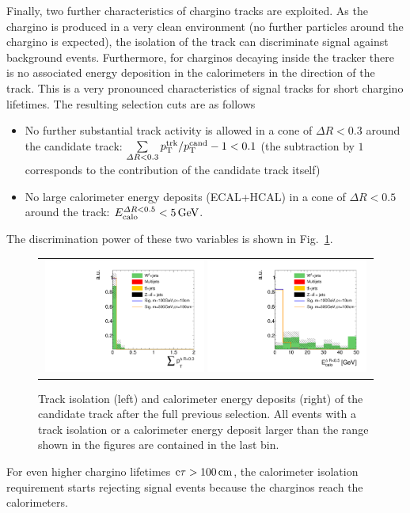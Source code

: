 Finally, two further characteristics of chargino tracks are exploited.
As the chargino is produced in a very clean environment (no further particles around the chargino is expected), the isolation of the track can discriminate signal against background events.
Furthermore, for charginos decaying inside the tracker there is no associated energy deposition in the calorimeters in the direction of the track.
This is a very pronounced characteristics of signal tracks for short chargino lifetimes. 
The resulting selection cuts are as follows
\begin{itemize}
\renewcommand{\labelitemi}{\footnotesize{\ding{118}}}
\item No further substantial track activity is allowed in a cone of $\Delta R < 0.3$ around the candidate track: \mbox{$\sum \limits_{\Delta R < 0.3} p_{\text{T}}^{\text{trk}}/p_{\text{T}}^{\text{cand}} - 1 < 0.1$} (the subtraction by $1$ corresponds to the contribution of the candidate track itself)
\item No large calorimeter energy deposits (ECAL+HCAL) in a cone of $\Delta R < 0.5$ around the track: \mbox{$E^{\Delta R<0.5}_{\text{calo}}<5\,\text{Ge}\kern-0.06667em\text{V}$}.
\end{itemize}
The discrimination power of these two variables is shown in Fig.~\ref{fig:TrackIso_Ecalo_After_Preselection}.
\begin{figure}[!b]
  \centering 
  \begin{tabular}{c}
    \includegraphics[width=0.49\textwidth]{figures/analysis_2/AnalysisSelection/chiTracksCandidateSelectionTrigger_2Signals_FullBkg/htrackIsolation_lin.pdf}
    \includegraphics[width=0.49\textwidth]{figures/analysis_2/AnalysisSelection/chiTracksCandidateSelectionTrigger_2Signals_FullBkg/htrackCaloIsolation_lin.pdf}
  \end{tabular}
  \caption{Track isolation (left) and calorimeter energy deposits (right) of the candidate track after the full previous selection. 
           All events with a track isolation or a calorimeter energy deposit larger than the range shown in the figures are contained in the last bin.}
  \label{fig:TrackIso_Ecalo_After_Preselection}
\end{figure}
For even higher chargino lifetimes $\text{c}\tau > 100\,\text{cm}$, the calorimeter isolation requirement starts rejecting signal events because the charginos reach the calorimeters.


